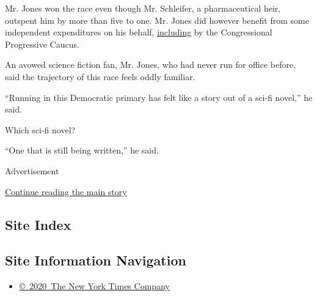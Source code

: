 Mr. Jones won the race even though Mr. Schleifer, a pharmaceutical heir,
outspent him by more than five to one. Mr. Jones did however benefit
from some independent expenditures on his behalf,
\href{https://www.politico.com/states/new-york/albany/story/2020/06/07/house-progressives-wade-into-new-york-primary-1291755}{including}
by the Congressional Progressive Caucus.

An avowed science fiction fan, Mr. Jones, who had never run for office
before, said the trajectory of this race feels oddly familiar.

``Running in this Democratic primary has felt like a story out of a
sci-fi novel,'' he said.

Which sci-fi novel?

``One that is still being written,'' he said.

Advertisement

\protect\hyperlink{after-bottom}{Continue reading the main story}

\hypertarget{site-index}{%
\subsection{Site Index}\label{site-index}}

\hypertarget{site-information-navigation}{%
\subsection{Site Information
Navigation}\label{site-information-navigation}}

\begin{itemize}
\tightlist
\item
  \href{https://help.nytimes.com/hc/en-us/articles/115014792127-Copyright-notice}{©~2020~The
  New York Times Company}
\end{itemize}

